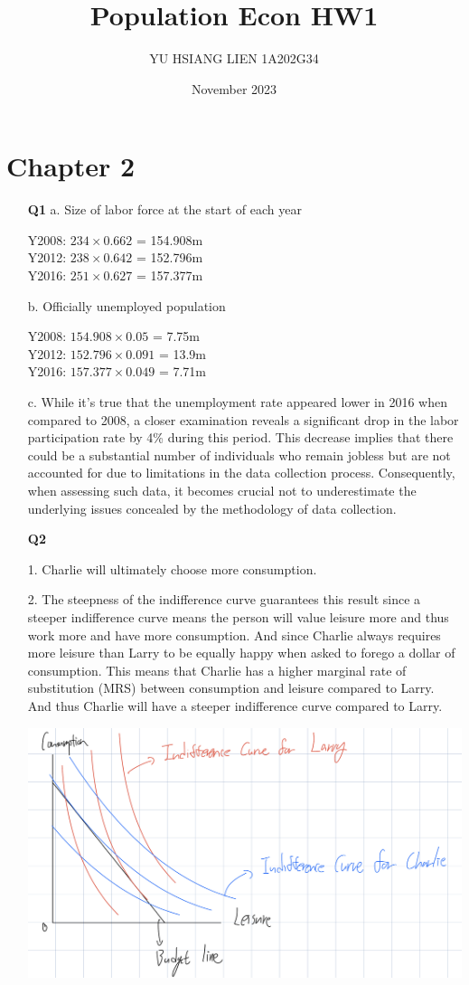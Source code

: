 \documentclass[12pt]{article}
\title{Population Econ HW1}
\author{YU HSIANG LIEN 1A202G34}
\date{November 2023}
\begin{document}
\maketitle

\section{Chapter 2}
\begin{enumerate}
    \item[\textbf{Q1}] 
    a. Size of labor force at the start of each year
    
    Y2008: $234 \times 0.662$ = 154.908m\\
    Y2012: $238 \times 0.642$ = 152.796m\\
    Y2016: $251 \times 0.627$ = 157.377m

    b. Officially unemployed population
    
    Y2008: $154.908 \times 0.05$ = 7.75m\\
    Y2012: $152.796 \times 0.091$ = 13.9m\\
    Y2016: $157.377 \times 0.049$ = 7.71m

    c. While it's true that the unemployment rate appeared lower in 2016 when compared to 2008, a closer examination reveals a significant drop in the labor participation rate by 4\% during this period. This decrease implies that there could be a substantial number of individuals who remain jobless but are not accounted for due to limitations in the data collection process. Consequently, when assessing such data, it becomes crucial not to underestimate the underlying issues concealed by the methodology of data collection.
    
    \item[\textbf{Q2}] 
    
    1. Charlie will ultimately choose more consumption.
       
    2. The steepness of the indifference curve guarantees this result since a steeper indifference curve means the person will value leisure more and thus work more and have more consumption. And since Charlie always requires more leisure than Larry to be equally happy when asked to forego a dollar of consumption. This means that Charlie has a higher marginal rate of substitution (MRS) between consumption and leisure compared to Larry. And thus Charlie will have a steeper indifference curve compared to Larry.
    
    \includegraphics[width=0.9\linewidth]{截圖 2023-11-04 上午3.54.13.png}
        

\end{enumerate}
\end{document}
